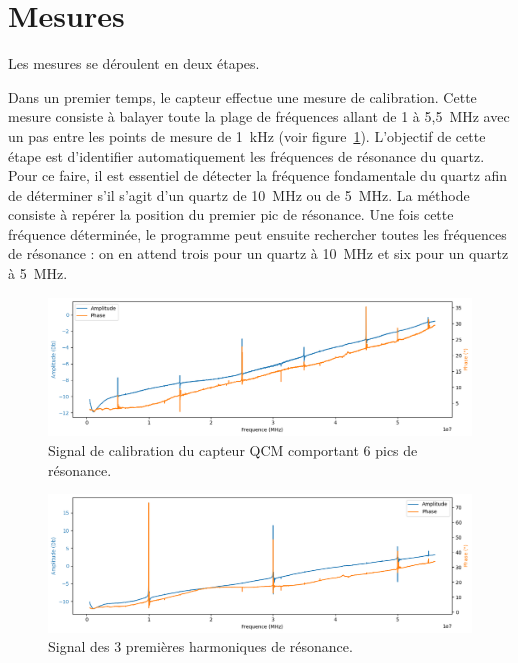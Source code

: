 
\newpage

\section{Mesures}

Les mesures se déroulent en deux étapes.

Dans un premier temps, le capteur effectue une mesure de calibration. Cette mesure consiste à balayer toute la plage de fréquences allant de 1 à 5{,}5~MHz avec un pas entre les points de mesure de 1~kHz (voir figure~\ref{fig:calibration 5MHz plot}).  
L’objectif de cette étape est d’identifier automatiquement les fréquences de résonance du quartz. Pour ce faire, il est essentiel de détecter la fréquence fondamentale du quartz afin de déterminer s’il s’agit d’un quartz de 10~MHz ou de 5~MHz.  
La méthode consiste à repérer la position du premier pic de résonance. Une fois cette fréquence déterminée, le programme peut ensuite rechercher toutes les fréquences de résonance : on en attend trois pour un quartz à 10~MHz et six pour un quartz à 5~MHz.

\begin{figure}[H]
    \centering
    \includegraphics[width=\textwidth]{assets/figures/5MhzCalibration.png}
    \caption{Signal de calibration du capteur QCM comportant 6 pics de résonance.}
    \label{fig:calibration 5MHz plot}
\end{figure}

\begin{figure}[H]
    \centering
    \includegraphics[width=\textwidth]{assets/figures/10MHzCalibration.png}
    \caption{Signal des 3 premières harmoniques de résonance.}
    \label{fig:harmonic 10MHz Calibration}
\end{figure}

